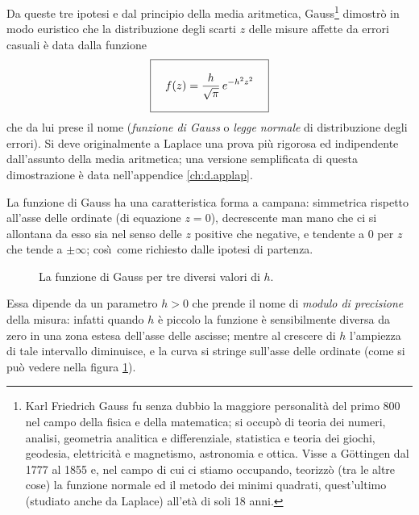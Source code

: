 Da queste tre ipotesi e dal principio della media
aritmetica, Gauss\/\footnote{Karl Friedrich Gauss fu senza
  dubbio la maggiore personalit\`a del primo 800 nel campo
  della fisica e della matematica; si occup\`o di teoria dei
  numeri, analisi, geometria analitica e differenziale,
  statistica e teoria dei giochi, geodesia, elettricit\`a e
  magnetismo, astronomia e ottica.  Visse a G\"ottingen dal
  1777 al 1855 e, nel campo di cui ci stiamo occupando,
  teorizz\`o (tra le altre cose) la funzione normale ed il
  metodo dei minimi quadrati, quest'ultimo (studiato anche
  da Laplace) all'et\`a di soli 18 anni.}%
%
dimostr\`o in modo euristico che la distribuzione degli
scarti $z$ delle misure affette da errori casuali \`e data
dalla funzione
\begin{equation} \label{eq:9.gauss}
  \boxed{ \rule[-6mm]{0mm}{14mm} \quad
    f(z) = \dfrac{h}{\sqrt{\pi}}
    \, e^{-h^2 z^2} \quad }
\end{equation}
che da lui prese il nome (\emph{funzione di Gauss} o
\emph{legge normale} di distribuzione degli errori).  Si
deve originalmente a Laplace%
una prova pi\`u rigorosa ed indipendente dall'assunto della
media aritmetica; una versione semplificata di questa
dimostrazione \`e data nell'appendice \ref{ch:d.applap}.

La funzione di Gauss ha una caratteristica forma a campana:
simmetrica rispetto all'asse delle ordinate (di equazione
$z=0$), decrescente man mano che ci si allontana da esso sia
nel senso delle $z$ positive che negative, e tendente a $0$
per $z$ che tende a $\pm \infty$; cos\`\i\ come richiesto
dalle ipotesi di partenza.
\begin{figure}[htbp]
  \vspace*{2ex}
  \begin{center} {
    
  } \end{center}
  \caption[Dipendenza da $h$ della distribuzione di Gauss]
    {La funzione di Gauss per tre diversi
    valori di $h$.}
  \label{fig:9.gauss}
\end{figure}

Essa dipende da un parametro $h>0$ che prende il nome di
\emph{modulo di precisione}%
della misura: infatti quando $h$ \`e piccolo la funzione \`e
sensibilmente diversa da zero in una zona estesa dell'asse
delle ascisse; mentre al crescere di $h$ l'ampiezza di tale
intervallo diminuisce, e la curva si stringe sull'asse delle
ordinate (come si pu\`o vedere nella figura
\ref{fig:9.gauss}).

